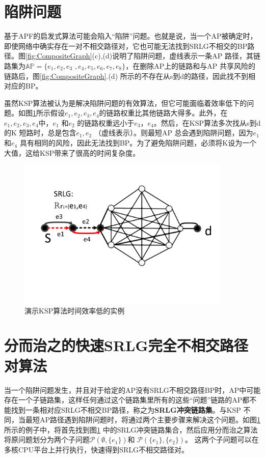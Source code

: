 \section{陷阱问题}
\label{sec:trapproblem}
基于APF的启发式算法可能会陷入“陷阱”问题。也就是说，当一个AP被确定时，即使网络中确实存在一对不相交路径对，它也可能无法找到SRLG不相交的BP路径。图\ref{fig:CompositeGraph}(c),(d)说明了陷阱问题，虚线表示一条AP 路径，其链路集为$\mathbb{AP}=\{e_1,e_2,e_3$ $,e_4,e_5,e_6,e_7,e_8\}$，在删除AP上的链路和与AP 共享风险的链路后，图\ref{fig:CompositeGraph}.(d) 所示的不存在从s到d的路径，因此找不到相对应的BP。

虽然KSP算法被认为是解决陷阱问题的有效算法，但它可能面临着效率低下的问题。如图\ref{fig:KSPproblem}所示假设$e_1, e_2, e_3, e_4$的链路权重比其他链路大得多。此外，在$e_1, e_2, e_3, e_4$中，$e_1$ 和$e_2$ 的链路权重远小于$e_3$，$e_4$。然后，在KSP算法多次找从s到d的K 短路时，总是包含$e_1,e_2$ （虚线表示）。则最短AP 总会遇到陷阱问题，因为$e_1$和$e_4$ 具有相同的风险，因此无法找到BP。为了避免陷阱问题，必须将K设为一个大值，这给KSP带来了很高的时间复杂度。
\begin{figure}[htbp]
\centering
\includegraphics[width=4.0in]{figures/KSPproblem}
  \caption{演示KSP算法时间效率低的实例}
  \label{fig:KSPproblem}
\end{figure}


\section{分而治之的快速SRLG完全不相交路径对算法}
当一个陷阱问题发生，并且对于给定的AP没有SRLG不相交路径BP时，AP中可能存在一个子链路集，这样任何通过这个链路集里所有的这些“问题”链路的AP都不能找到一条相对应SRLG不相交BP路径，称之为\textbf{SRLG冲突链路集}。与KSP 不同，当最短AP路径遇到陷阱问题时，将通过两个主要步骤来解决这个问题。如图\ref{fig:KSPproblem} 所示的例子中，将首先找到图\ref{fig:KSPproblem} 中的SRLG冲突链路集合，然后应用分而治之算法将原问题划分为两个子问题$\mathcal{P}(\emptyset,\{e_1\})$和 $\mathcal{P}(\{e_1\},\{e_2\})$。 这两个子问题可以在多核CPU平台上并行执行，快速得到SRLG不相交路径对。
